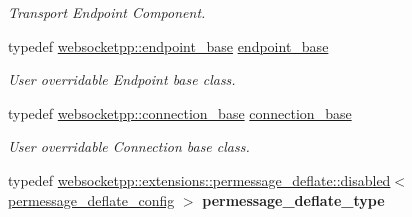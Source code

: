 \begin{DoxyCompactItemize}
\begin{DoxyCompactList}\small\item\em Transport Endpoint Component. \end{DoxyCompactList}\item 
typedef \hyperlink{classwebsocketpp_1_1endpoint__base}{websocketpp\+::endpoint\+\_\+base} \hyperlink{structwebsocketpp_1_1config_1_1core_a5389422816ef3115fb8b7f4cd92d5ca3}{endpoint\+\_\+base}\hypertarget{structwebsocketpp_1_1config_1_1core_a5389422816ef3115fb8b7f4cd92d5ca3}{}\label{structwebsocketpp_1_1config_1_1core_a5389422816ef3115fb8b7f4cd92d5ca3}

\begin{DoxyCompactList}\small\item\em User overridable Endpoint base class. \end{DoxyCompactList}\item 
typedef \hyperlink{classwebsocketpp_1_1connection__base}{websocketpp\+::connection\+\_\+base} \hyperlink{structwebsocketpp_1_1config_1_1core_a8e35ea7d03ba80347094fd53e1cac178}{connection\+\_\+base}\hypertarget{structwebsocketpp_1_1config_1_1core_a8e35ea7d03ba80347094fd53e1cac178}{}\label{structwebsocketpp_1_1config_1_1core_a8e35ea7d03ba80347094fd53e1cac178}

\begin{DoxyCompactList}\small\item\em User overridable Connection base class. \end{DoxyCompactList}\item 
typedef \hyperlink{classwebsocketpp_1_1extensions_1_1permessage__deflate_1_1disabled}{websocketpp\+::extensions\+::permessage\+\_\+deflate\+::disabled}$<$ \hyperlink{structwebsocketpp_1_1config_1_1core_1_1permessage__deflate__config}{permessage\+\_\+deflate\+\_\+config} $>$ {\bfseries permessage\+\_\+deflate\+\_\+type}\hypertarget{structwebsocketpp_1_1config_1_1core_a563c271682eaf48c114f0efca4072c3f}{}\label{structwebsocketpp_1_1config_1_1core_a563c271682eaf48c114f0efca4072c3f}

\end{DoxyCompactItemize}
